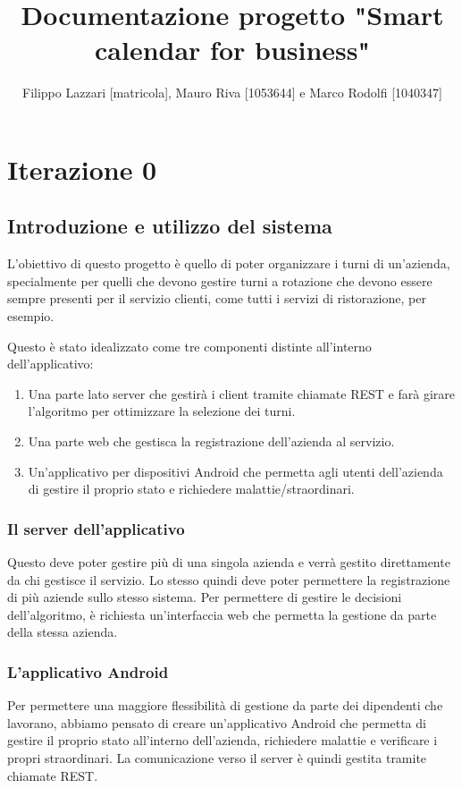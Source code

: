 \documentclass{article}
\title{Documentazione progetto "Smart calendar for business"}
\author{Filippo Lazzari [matricola], Mauro Riva [1053644] e Marco Rodolfi [1040347]}
\date{}
\begin{document}
\maketitle
\section{Iterazione 0}
\subsection{Introduzione e utilizzo del sistema}
L'obiettivo di questo progetto è quello di poter organizzare i turni di un'azienda, specialmente per quelli che devono gestire turni a rotazione che devono essere sempre presenti per il servizio clienti, come tutti i servizi di ristorazione, per esempio. 

Questo è stato idealizzato come tre componenti distinte all'interno dell'applicativo:
\begin{enumerate}
\item Una parte lato server che gestirà i client tramite chiamate REST e farà girare l'algoritmo per ottimizzare la selezione dei turni.
\item Una parte web che gestisca la registrazione dell'azienda al servizio.
\item Un'applicativo per dispositivi Android che permetta agli utenti dell'azienda di gestire il proprio stato e richiedere malattie/straordinari.
\end{enumerate}
\subsubsection{Il server dell'applicativo}
Questo deve poter gestire più di una singola azienda e verrà gestito direttamente da chi gestisce il servizio. Lo stesso quindi deve poter permettere la registrazione di più aziende sullo stesso sistema. Per permettere di gestire le decisioni dell'algoritmo, è richiesta un'interfaccia web che permetta la gestione da parte della stessa azienda.
\subsubsection{L'applicativo Android}
Per permettere una maggiore flessibilità di gestione da parte dei dipendenti che lavorano, abbiamo pensato di creare un'applicativo Android che permetta di gestire il proprio stato all'interno dell'azienda, richiedere malattie e verificare i propri straordinari. La comunicazione verso il server è quindi gestita tramite chiamate REST.
\end{document}
